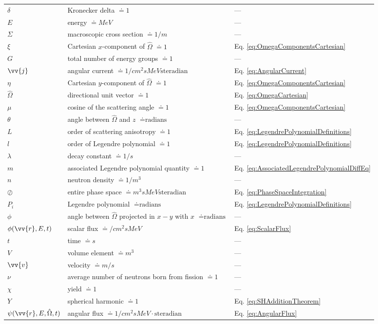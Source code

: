 \documentclass[10pt]{article}
\begin{document}
\begin{flushleft}
\begin{tabular}{l l l}
\(\delta\) & Kronecker delta \(\doteq 1\) & ---\\
\(E\) & energy \(\doteq MeV\) & ---\\
\(\Sigma\) & macroscopic cross section \(\doteq 1/m\) & ---\\
\(\xi\) & Cartesian \(x\)-component of \(\hat{\Omega}\) \(\doteq 1\) & Eq. \ref{eq:OmegaComponentsCartesian}\\
\(G\) & total number of energy groups \(\doteq 1\) & ---\\
\(\vv{j}\) & angular current \(\doteq 1/cm^2sMeV\textrm{steradian}\) & Eq. \ref{eq:AngularCurrent}\\
\(\eta\) & Cartesian \(y\)-component of \(\hat{\Omega}\) \(\doteq 1\) & Eq. \ref{eq:OmegaComponentsCartesian}\\
\(\hat{\Omega}\) & directional unit vector \(\doteq 1\) & Eq. \ref{eq:OmegaCartesian}\\
\(\mu\) & cosine of the scattering angle \(\doteq 1\) & Eq. \ref{eq:OmegaComponentsCartesian}\\
\(\theta\) & angle between \(\hat{\Omega}\) and \(z\) \(\doteq \textrm{radians}\) & ---\\
\(L\) & order of scattering anisotropy \(\doteq 1\) & Eq. \ref{eq:LegendrePolynomialDefinitions}\\
\(l\) & order of Legendre polynomial \(\doteq 1\) & Eq. \ref{eq:LegendrePolynomialDefinitions}\\
\(\lambda\) & decay constant \(\doteq 1/s\) & ---\\
\(m\) & associated Legendre polynomial quantity \(\doteq 1\) & Eq. \ref{eq:AssociatedLegendrePolynomialDiffEq}\\
\(n\) & neutron density \(\doteq 1/m^3\) & ---\\
\(\oslash\) & entire phase space \(\doteq m^3sMeV\textrm{steradian}\) & Eq. \ref{eq:PhaseSpaceIntegration}\\
\(P_i\) & Legendre polynomial \(\doteq \textrm{radians}\) & Eq. \ref{eq:LegendrePolynomialDefinitions}\\
\(\phi\) & angle between \(\hat{\Omega}\) projected in \(x-y\) with \(x\) \(\doteq \textrm{radians}\) & ---\\
\(\phi(\vv{r}, E, t)\) & scalar flux \(\doteq /cm^2sMeV\) & Eq. \ref{eq:ScalarFlux}\\
\(t\) & time \(\doteq s\) & ---\\
\(V\) & volume element \(\doteq m^3\) & ---\\
\(\vv{v}\) & velocity \(\doteq m/s\) & ---\\
\(\nu\) & average number of neutrons born from fission \(\doteq 1\) & ---\\
\(\chi\) & yield \(\doteq 1\) & ---\\
\(Y\) & spherical harmonic \(\doteq 1\) & Eq. \ref{eq:SHAdditionTheorem}\\
\(\psi(\vv{r}, E, \hat{\Omega}, t)\) & angular flux \(\doteq 1/cm^2sMeV\cdot\textrm{steradian}\) & Eq. \ref{eq:AngularFlux}\\


\end{tabular}
\end{flushleft}
\end{document}
